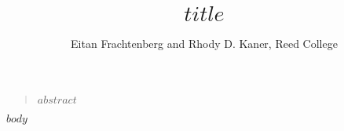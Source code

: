 \documentclass[12pt]{article}
\title{$title$}
\author{Eitan Frachtenberg and Rhody D. Kaner, Reed College}
\newenvironment{sciabstract}{%
\begin{quote} \bf}
{\end{quote}}
\begin{document}
\maketitle

\begin{sciabstract}
  $abstract$
\end{sciabstract}

$body$

\newpage{}



\end{document}
